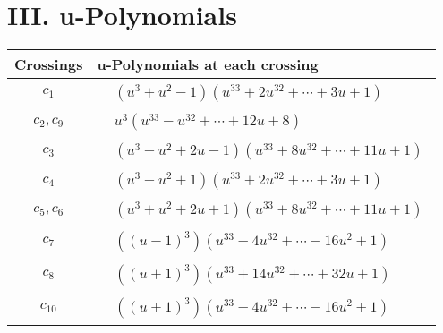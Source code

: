\documentclass[1p]{elsarticle_modified}
\theoremstyle{definition}
\begin{document}
\newpage\renewcommand{\arraystretch}{1}
\centering \section*{ III. u-Polynomials}
\begin{tabular}{m{50pt}|m{274pt}}
Crossings & \hspace{64pt}u-Polynomials at each crossing \\
\hline $$\begin{aligned}c_{1}\end{aligned}$$&$\begin{aligned}
&(u^3+u^2-1)(u^{33}+2 u^{32}+\cdots+3 u+1)
\end{aligned}$\\
\hline $$\begin{aligned}c_{2},c_{9}\end{aligned}$$&$\begin{aligned}
&u^3(u^{33}- u^{32}+\cdots+12 u+8)
\end{aligned}$\\
\hline $$\begin{aligned}c_{3}\end{aligned}$$&$\begin{aligned}
&(u^3- u^2+2 u-1)(u^{33}+8 u^{32}+\cdots+11 u+1)
\end{aligned}$\\
\hline $$\begin{aligned}c_{4}\end{aligned}$$&$\begin{aligned}
&(u^3- u^2+1)(u^{33}+2 u^{32}+\cdots+3 u+1)
\end{aligned}$\\
\hline $$\begin{aligned}c_{5},c_{6}\end{aligned}$$&$\begin{aligned}
&(u^3+u^2+2 u+1)(u^{33}+8 u^{32}+\cdots+11 u+1)
\end{aligned}$\\
\hline $$\begin{aligned}c_{7}\end{aligned}$$&$\begin{aligned}
&((u-1)^3)(u^{33}-4 u^{32}+\cdots-16 u^2+1)
\end{aligned}$\\
\hline $$\begin{aligned}c_{8}\end{aligned}$$&$\begin{aligned}
&((u+1)^3)(u^{33}+14 u^{32}+\cdots+32 u+1)
\end{aligned}$\\
\hline $$\begin{aligned}c_{10}\end{aligned}$$&$\begin{aligned}
&((u+1)^3)(u^{33}-4 u^{32}+\cdots-16 u^2+1)
\end{aligned}$\\
\hline
\end{tabular}\newpage\renewcommand{\arraystretch}{1}
\end{document}
